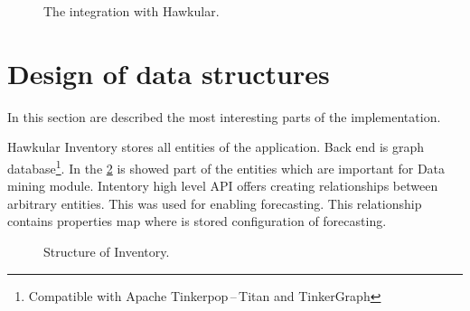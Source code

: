     \begin{figure}[H]
        \begin{center}
            \caption{The integration with Hawkular.}
            \label{img_integration}
        \end{center}
    \end{figure}

    \section{Design of data structures}
    In this section are described the most interesting parts of the implementation.
    
    Hawkular Inventory stores all entities of the application. Back end is graph
    database\footnote{Compatible with Apache Tinkerpop\,--\,Titan and TinkerGraph}.
    In the \ref{img_inventory} is showed part of the entities which are important for 
    Data mining module.
    Intentory high level API offers creating relationships between arbitrary entities. 
    This was used for enabling forecasting. This relationship contains properties map
    where is stored configuration of forecasting.

    \begin{figure}[H]
        \begin{center}
            \caption{Structure of Inventory.}
            \label{img_inventory}
        \end{center}
    \end{figure}

